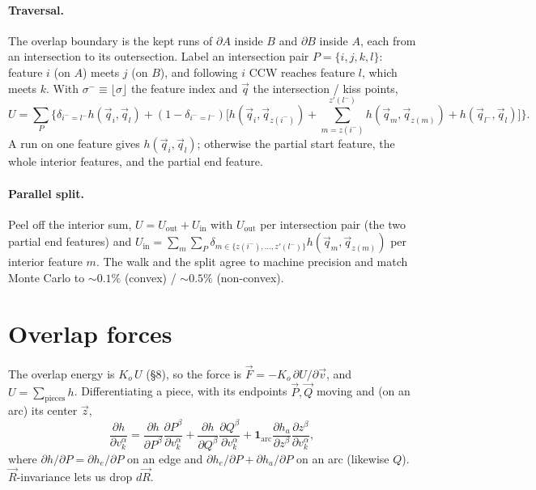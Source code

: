 \documentclass[11pt]{article}
\numberwithin{equation}{section}
\newcommand{\vv}[1]{\vec{#1}}
\begin{document}
\paragraph{Traversal.} The overlap boundary is the kept runs of $\partial A$ inside $B$ and
$\partial B$ inside $A$, each from an intersection to its outersection. Label an intersection pair
$P=\{i,j,k,l\}$: feature $i$ (on $A$) meets $j$ (on $B$), and following $i$ CCW reaches feature $l$,
which meets $k$. With $\sigma^{-}\equiv\lfloor\sigma\rfloor$ the feature index and $\vv q$ the
intersection / kiss points,
\begin{equation}
  U=\sum_{P}\Big\{\delta_{i^{-}=l^{-}}h(\vv q_i,\vv q_l)
  +(1-\delta_{i^{-}=l^{-}})\Big[h(\vv q_i,\vv q_{z(i^{-})})
  +\!\!\sum_{m=z(i^{-})}^{z'(l^{-})}\!\!h(\vv q_m,\vv q_{z(m)})+h(\vv q_{l^{-}},\vv q_l)\Big]\Big\}.
\end{equation}
A run on one feature gives $h(\vv q_i,\vv q_l)$; otherwise the partial start feature, the whole
interior features, and the partial end feature.

\paragraph{Parallel split.} Peel off the interior sum, $U=U_{\mathrm{out}}+U_{\mathrm{in}}$ with
$U_{\mathrm{out}}$ per intersection pair (the two partial end features) and $U_{\mathrm{in}}=\sum_m\sum_P
\delta_{m\in\{z(i^{-}),\dots,z'(l^{-})\}}h(\vv q_m,\vv q_{z(m)})$ per interior feature $m$. The walk
and the split agree to machine precision and match Monte Carlo to $\sim0.1\%$ (convex) /
$\sim0.5\%$ (non-convex).

\section{Overlap forces}

The overlap energy is $K_o\,U$ (\S8), so the force is $\vv F=-K_o\,\partial U/\partial\vv v$, and
$U=\sum_{\text{pieces}}h$. Differentiating a piece, with its endpoints $\vv P,\vv Q$ moving and (on
an arc) its center $\vv z$,
\begin{equation}
  \frac{\partial h}{\partial v_k^{\alpha}}
  =\frac{\partial h}{\partial P^{\beta}}\frac{\partial P^{\beta}}{\partial v_k^{\alpha}}
  +\frac{\partial h}{\partial Q^{\beta}}\frac{\partial Q^{\beta}}{\partial v_k^{\alpha}}
  +\mathbf 1_{\text{arc}}\frac{\partial h_a}{\partial z^{\beta}}\frac{\partial z^{\beta}}{\partial v_k^{\alpha}},
\end{equation}
where $\partial h/\partial P=\partial h_e/\partial P$ on an edge and $\partial h_e/\partial
P+\partial h_a/\partial P$ on an arc (likewise $Q$). $\vv R$-invariance lets us drop $d\vv R$.
\end{document}
